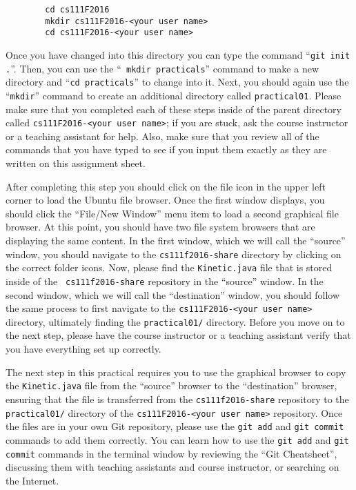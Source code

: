     \vspace*{-.1in}
    \begin{verbatim}
        cd cs111F2016
        mkdir cs111F2016-<your user name>
        cd cs111F2016-<your user name>
    \end{verbatim}
    \vspace*{-.3in}

Once you have changed into this directory you can type the command ``{\tt git init .}''. Then, you can use the ``{\tt
mkdir practicals}'' command to make a new directory and ``{\tt cd practicals}'' to change into it.  Next, you should
again use the ``{\tt mkdir}'' command to create an additional directory called {\tt practical01}.  Please make sure that
you completed each of these steps inside of the parent directory called {\tt cs111F2016-<your user name>}; if you are
stuck, ask the course instructor or a teaching assistant for help. Also, make sure that you review all of the commands
that you have typed to see if you input them exactly as they are written on this assignment sheet.

After completing this step you should click on the file icon in the upper left corner to load the Ubuntu file browser.
Once the first window displays, you should click the ``File/New Window'' menu item to load a second graphical file
browser. At this point, you should have two file system browsers that are displaying the same content.  In the first
window, which we will call the ``source'' window, you should navigate to the {\tt cs111f2016-share} directory by
clicking on the correct folder icons.  Now, please find the {\tt Kinetic.java} file that is stored inside of the {\tt
cs111f2016-share} repository in the ``source'' window. In the second window, which we will call the ``destination''
window, you should follow the same process to first navigate to the {\tt cs111F2016-<your user name>} directory,
ultimately finding the {\tt practical01/} directory. Before you move on to the next step, please have the course
instructor or a teaching assistant verify that you have everything set up correctly.

The next step in this practical requires you to use the graphical browser to copy the {\tt Kinetic.java} file from the
``source'' browser to the ``destination'' browser, ensuring that the file is transferred from the {\tt cs111f2016-share}
repository to the {\tt practical01/} directory of the {\tt cs111F2016-<your user name>} repository.  Once the files are
in your own Git repository, please use the {\tt git add} and {\tt git commit} commands to add them correctly. You can
learn how to use the {\tt git add} and {\tt git commit} commands in the terminal window by reviewing the ``Git
Cheatsheet'', discussing them with teaching assistants and course instructor, or searching on the Internet.

